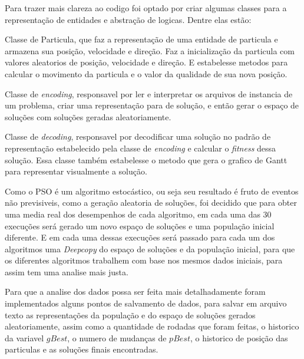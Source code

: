         Para trazer mais clareza ao codigo foi optado por criar algumas classes para a representação de entidades e abstração de logicas. Dentre elas estão:\newline
        
        Classe de Particula, que faz a representação de uma entidade de particula e armazena sua posição, velocidade e direção. Faz a inicialização da particula com valores aleatorios de posição, velocidade e direção. E estabelesse metodos para calcular o movimento da particula e o valor da qualidade de sua nova posição.\newline
        
        Classe de \textit{encoding}, responsavel por ler e interpretar os arquivos de instancia de um problema, criar uma representação para de solução, e então gerar o espaço de soluções com soluções geradas aleatoriamente.\newline
         
        Classe de \textit{decoding}, responsavel por decodificar uma solução no padrão de representação estabelecido pela classe de \textit{encoding} e calcular o \textit{fitness} dessa solução. Essa classe também estabelesse o metodo que gera o grafico de Gantt para representar visualmente a solução.\newline
        

        Como o PSO é um algoritmo estocástico, ou seja seu resultado é fruto de eventos não previsiveis, como a geração aleatoria de soluções, foi decidido que para obter uma media real dos desempenhos de cada algoritmo, em cada uma das 30 execuções será gerado um novo espaço de soluções e uma população inicial diferente.\newline
        E em cada uma dessas execuções será passado para cada um dos algoritmos uma \textit{Deepcopy} do espaço de soluções e da população inicial, para que os diferentes algoritmos trabalhem com base nos mesmos dados iniciais, para assim tem uma analise mais justa.\newline

        Para que a analise dos dados possa ser feita mais detalhadamente foram implementados alguns pontos de salvamento de dados, para salvar em arquivo texto as representações da população e do espaço de soluções gerados aleatoriamente, assim como a quantidade de rodadas que foram feitas, o historico da variavel $gBest$, o numero de mudanças de $pBest$, o historico de posição das particulas e as soluções finais encontradas.


